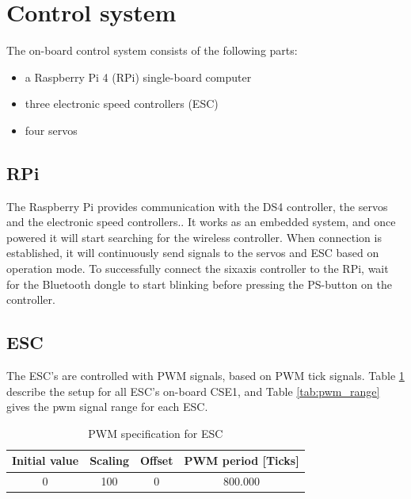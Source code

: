 \section{Control system}
The on-board control system consists of the following parts:
\begin{itemize}
	\item a Raspberry Pi 4 (RPi) single-board computer
	\item three electronic speed controllers (ESC)
	\item four servos
\end{itemize}
\subsection{RPi}

The Raspberry Pi provides communication 
with the DS4 controller, the servos and the electronic speed controllers.. It works as an embedded system, and once powered it will start searching for the wireless controller. When connection is established, it will continuously send signals to the servos and ESC based on operation mode. To successfully connect the sixaxis controller to the RPi, wait for the Bluetooth dongle to start blinking before pressing the PS-button on the controller. 

\subsection{ESC}
The ESC's are controlled with PWM signals, based on PWM tick signals. Table \ref{tab:pwm_spec} describe the setup for all ESC's on-board CSE1, and Table \ref{tab:pwm_range} gives the pwm signal range for each ESC.
\begin{table}[h!]
	\centering
	\caption{PWM specification for ESC}
	\label{tab:pwm_spec}
	\begin{tabular}{cccc}
		\hline
		\textbf{Initial value} & \textbf{Scaling} & \textbf{Offset} & \textbf{PWM period} [Ticks] \\ \hline
		0 & 100 & 0 & 800.000\\ \hline
	\end{tabular}
\end{table}

